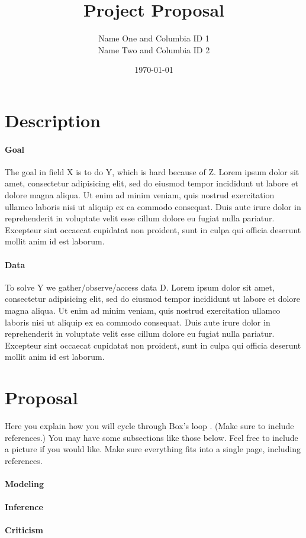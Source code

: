\documentclass{article}
\begin{document}
\title{\textbf{Project Proposal}}
\date{\today}
\author{
Name One and Columbia ID 1\\
Name Two and Columbia ID 2
}

\maketitle

\section{Description}

\paragraph{Goal} The goal in field X is to do Y, which is hard because of Z.
Lorem ipsum dolor sit amet, consectetur adipisicing elit, sed do eiusmod
tempor incididunt ut labore et dolore magna aliqua. Ut enim ad minim veniam,
quis nostrud exercitation ullamco laboris nisi ut aliquip ex ea commodo
consequat. Duis aute irure dolor in reprehenderit in voluptate velit esse
cillum dolore eu fugiat nulla pariatur. Excepteur sint occaecat cupidatat non
proident, sunt in culpa qui officia deserunt mollit anim id est laborum.

\paragraph{Data} To solve Y we gather/observe/access data D.
Lorem ipsum dolor sit amet, consectetur adipisicing elit, sed do eiusmod
tempor incididunt ut labore et dolore magna aliqua. Ut enim ad minim veniam,
quis nostrud exercitation ullamco laboris nisi ut aliquip ex ea commodo
consequat. Duis aute irure dolor in reprehenderit in voluptate velit esse
cillum dolore eu fugiat nulla pariatur. Excepteur sint occaecat cupidatat non
proident, sunt in culpa qui officia deserunt mollit anim id est laborum.

\section{Proposal}

Here you explain how you will cycle through Box's loop \citep{box1976science}.
(Make sure to include references.) You may have some subsections like those
below. Feel free to include a picture if you would like. Make sure everything
fits into a single page, including references.

\paragraph{Modeling}

\paragraph{Inference}

\paragraph{Criticism}




\end{document}
